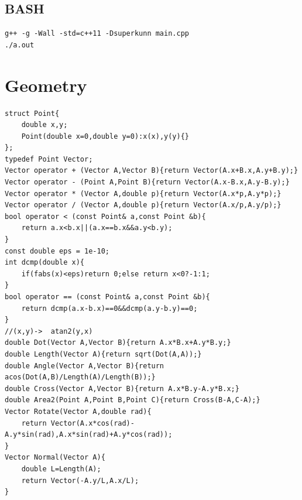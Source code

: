 \documentclass[twoside]{article}
\begin{document}
\subsection{BASH}
\begin{lstlisting}
g++ -g -Wall -std=c++11 -Dsuperkunn main.cpp
./a.out
\end{lstlisting}
\clearpage\section{Geometry}
\begin{lstlisting}
struct Point{
    double x,y;
    Point(double x=0,double y=0):x(x),y(y){}
};
typedef Point Vector;
Vector operator + (Vector A,Vector B){return Vector(A.x+B.x,A.y+B.y);}
Vector operator - (Point A,Point B){return Vector(A.x-B.x,A.y-B.y);}
Vector operator * (Vector A,double p){return Vector(A.x*p,A.y*p);}
Vector operator / (Vector A,double p){return Vector(A.x/p,A.y/p);}
bool operator < (const Point& a,const Point &b){
    return a.x<b.x||(a.x==b.x&&a.y<b.y);
}
const double eps = 1e-10;
int dcmp(double x){
    if(fabs(x)<eps)return 0;else return x<0?-1:1;
}
bool operator == (const Point& a,const Point &b){
    return dcmp(a.x-b.x)==0&&dcmp(a.y-b.y)==0;
}
//(x,y)->  atan2(y,x)
double Dot(Vector A,Vector B){return A.x*B.x+A.y*B.y;}
double Length(Vector A){return sqrt(Dot(A,A));}
double Angle(Vector A,Vector B){return acos(Dot(A,B)/Length(A)/Length(B));}
double Cross(Vector A,Vector B){return A.x*B.y-A.y*B.x;}
double Area2(Point A,Point B,Point C){return Cross(B-A,C-A);}
Vector Rotate(Vector A,double rad){
    return Vector(A.x*cos(rad)-A.y*sin(rad),A.x*sin(rad)+A.y*cos(rad));
}
Vector Normal(Vector A){
    double L=Length(A);
    return Vector(-A.y/L,A.x/L);
}
\end{lstlisting}
\end{document}
